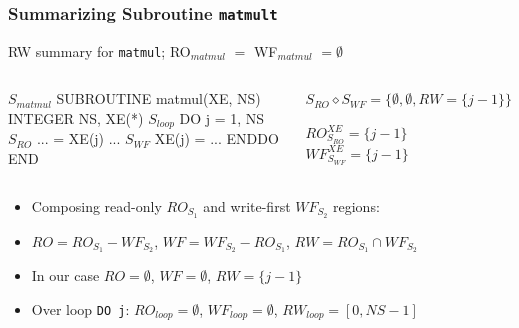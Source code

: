 \documentclass{beamer}
\renewcommand{\emph}[1]{\textcolor{structure}{#1}}
\newcommand{\emp}[1]{\textcolor{DikuRed}{ #1}}
\newcommand{\mymath}[1]{$ #1 $}
\newcommand{\myindx}[1]{_{#1}}
\newcommand{\myindu}[1]{^{#1}}
\begin{document}
\begin{frame}[fragile,t]
  \frametitle{Summarizing Subroutine {\tt matmult}}

\begin{block}{RW summary for {\tt matmul}; RO$_{matmul}$ $=$ WF$_{matmul}$ $= \emptyset$ } \vspace{-1ex}
\begin{columns} 
\begin{colorcode}[fontsize=\scriptsize]
\mymath{S\myindx{matmul}}  SUBROUTINE matmul(XE, NS)
          INTEGER NS, XE(*)
\mymath{S\myindx{loop}}       \emph{DO j = 1, NS}
\mymath{S\myindx{RO}}          \alert{...   \hspace{0.5ex}= XE(j) ...}
\mymath{S\myindx{WF}}          \alert{XE(j) = ...}
          \emph{ENDDO}
        END
\end{colorcode}
\begin{colorcode}[fontsize=\scriptsize]


\emp{\mymath{S\myindx{RO} \diamond S\myindx{WF} = \{\emptyset, \emptyset, RW=\{j-1\}\}}}

\alert{\mymath{RO\myindu{XE}\myindx{S\myindx{RO}} = \{j-1\}}}
\alert{\mymath{WF\myindu{XE}\myindx{S\myindx{WF}} = \{j-1\}}}
\end{colorcode}
\end{columns}
\end{block}

\bigskip

\begin{itemize}
    \item Composing read-only $RO_{S_1}$ and write-first $WF_{S_2}$ regions:  \smallskip
    \item $RO = RO_{S_1} - WF_{S_2}$, $WF = WF_{S_2} - RO_{S_1}$, $RW = RO_{S_1} \cap WF_{S_2}$  \smallskip
    \item In our case $RO = \emptyset$, $WF = \emptyset$, \emp{$RW = \{j-1\}$}  \smallskip
    \item Over loop {\tt DO j}:  $RO_{loop} = \emptyset$, $WF_{loop} = \emptyset$, \emph{$RW_{loop} = [0, NS-1]$}  \smallskip
\end{itemize}
\end{frame}
\end{document}
